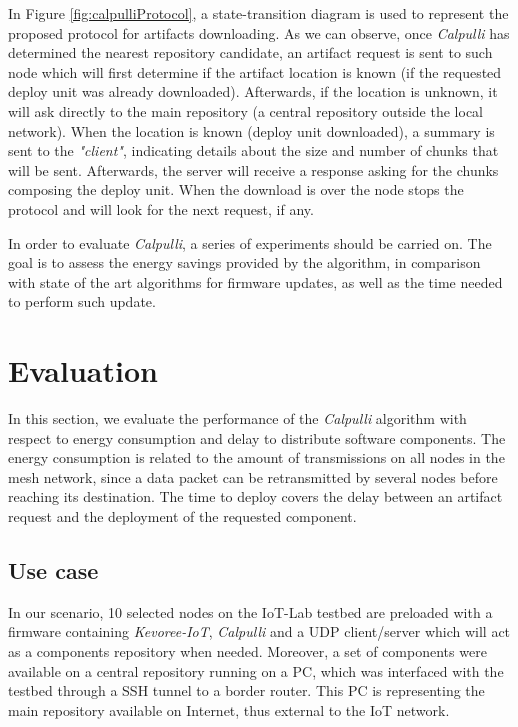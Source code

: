 In Figure \ref{fig:calpulliProtocol}, a state-transition diagram is used to represent the proposed protocol for artifacts downloading.
As we can observe, once \textit{Calpulli} has determined the nearest repository candidate, an artifact request is sent to such node which will first determine if the artifact location is known (if the requested deploy unit was already downloaded). Afterwards, if the location is unknown, it will ask directly to the main repository (a central repository outside the local network).
When the location is known (deploy unit downloaded), a summary is sent to the \textit{"client"}, indicating details about the size and number of chunks that will be sent.
Afterwards, the server will receive a response asking for the chunks composing the deploy unit.
When the download is over the node stops the protocol and will look for the next request, if any.

In order to evaluate \textit{Calpulli}, a series of experiments should be carried on.
The goal is to assess the energy savings provided by the algorithm, in comparison with state of the art algorithms for firmware updates, as well as the time needed to perform such update.



\section{Evaluation}
In this section, we evaluate the performance of the \textit{Calpulli} algorithm with respect to energy consumption and delay to distribute software components.
The energy consumption is related to the amount of transmissions on all nodes in the mesh network, since a data packet can be retransmitted by several nodes before reaching its destination.
The time to deploy covers the delay between an artifact request and the deployment of the requested component.

\subsection{Use case}
In our scenario, 10 selected nodes on the IoT-Lab testbed are preloaded with a firmware containing \textit{Kevoree-IoT}, \textit{Calpulli} and a UDP client/server which will act as a components repository when needed.
Moreover, a set of components were available on a central repository running on a PC, which was interfaced with the testbed through a SSH tunnel to a border router. This PC is representing the main repository available on Internet, thus external to the IoT network.

